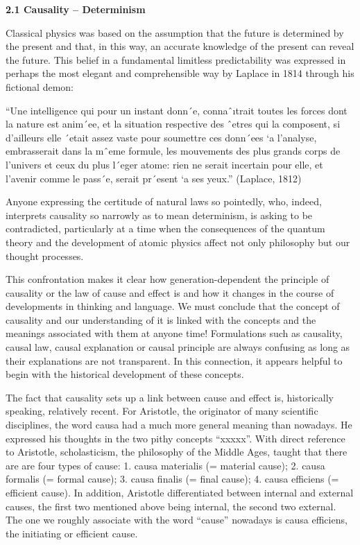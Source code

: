 \documentclass[12pt]{article}
\begin{document}
\hfill

\textbf{2.1 Causality – Determinism}

\hfill

Classical physics was based on the assumption that the future is determined by
the present and that, in this way, an accurate knowledge of the present can reveal
the future. This belief in a fundamental limitless predictability was expressed in
perhaps the most elegant and comprehensible way by Laplace in 1814 through his
fictional demon:

\hfill

“Une intelligence qui pour un instant donn´e, connaˆıtrait toutes les forces
dont la nature est anim´ee, et la situation respective des ˆetres qui la composent,
si d’ailleurs elle ´etait assez vaste pour soumettre ces donn´ees `a
l’analyse, embrasserait dans la mˆeme formule, les mouvements des plus
grands corps de l’univers et ceux du plus l´eger atome: rien ne serait incertain
pour elle, et l’avenir comme le pass´e, serait pr´esent `a ses yeux.”
(Laplace, 1812)

\hfill

Anyone expressing the certitude of natural laws so pointedly, who, indeed, interprets
causality so narrowly as to mean determinism, is asking to be contradicted,
particularly at a time when the consequences of the quantum theory and the development
of atomic physics affect not only philosophy but our thought processes.

\hfill

This confrontation makes it clear how generation-dependent the principle of causality
or the law of cause and effect is and how it changes in the course of developments
in thinking and language. We must conclude that the concept of causality and our
understanding of it is linked with the concepts and the meanings associated with
them at anyone time! Formulations such as causality, causal law, causal explanation
or causal principle are always confusing as long as their explanations are not
transparent. In this connection, it appears helpful to begin with the historical development
of these concepts.

\hfill

The fact that causality sets up a link between cause and effect is, historically speaking,
relatively recent. For Aristotle, the originator of many scientific disciplines, the
word causa had a much more general meaning than nowadays. He expressed his
thoughts in the two pithy concepts “xxxxx”. With direct reference
to Aristotle, scholasticism, the philosophy of the Middle Ages, taught that
there are are four types of cause: 1. causa materialis (= material cause); 2. causa
formalis (= formal cause); 3. causa finalis (= final cause); 4. causa efficiens (=
efficient cause). In addition, Aristotle differentiated between internal and external
causes, the first two mentioned above being internal, the second two external. The
one we roughly associate with the word “cause” nowadays is causa efficiens, the
initiating or efficient cause.
\end{document}
